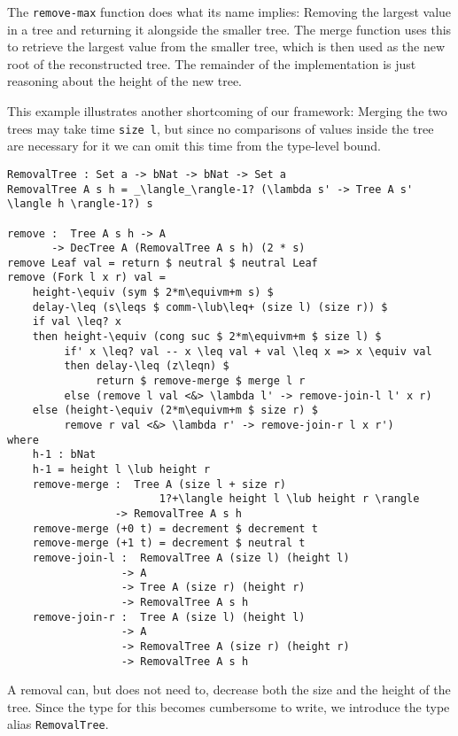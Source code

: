 The \texttt{remove-max} function does what its name implies: Removing the largest value in a tree and returning it alongside the smaller tree. The merge function uses this to retrieve the largest value from the smaller tree, which is then used as the new root of the reconstructed tree. The remainder of the implementation is just reasoning about the height of the new tree.

This example illustrates another shortcoming of our framework: Merging the two trees may take time \texttt{size l}, but since no comparisons of values inside the tree are necessary for it we can omit this time from the type-level bound.

\begin{lstlisting}[caption={Tree Removal},label={lst:tree:removal},emph={Tree,Fork,Leaf,RemovalTree,return,if,then,else,neutral,decrement,remove}]
RemovalTree : Set a -> bNat -> bNat -> Set a
RemovalTree A s h = _\langle_\rangle-1? (\lambda s' -> Tree A s' \langle h \rangle-1?) s

remove :  Tree A s h -> A
       -> DecTree A (RemovalTree A s h) (2 * s)
remove Leaf val = return $ neutral $ neutral Leaf
remove (Fork l x r) val =
    height-\equiv (sym $ 2*m\equivm+m s) $
    delay-\leq (s\leqs $ comm-\lub\leq+ (size l) (size r)) $
    if val \leq? x
    then height-\equiv (cong suc $ 2*m\equivm+m $ size l) $
         if' x \leq? val -- x \leq val + val \leq x => x \equiv val
         then delay-\leq (z\leqn) $
              return $ remove-merge $ merge l r
         else (remove l val <&> \lambda l' -> remove-join-l l' x r)
    else (height-\equiv (2*m\equivm+m $ size r) $
         remove r val <&> \lambda r' -> remove-join-r l x r')
where
    h-1 : bNat
    h-1 = height l \lub height r
    remove-merge :  Tree A (size l + size r)
                        1?+\langle height l \lub height r \rangle
                 -> RemovalTree A s h
    remove-merge (+0 t) = decrement $ decrement t
    remove-merge (+1 t) = decrement $ neutral t
    remove-join-l :  RemovalTree A (size l) (height l)
                  -> A
                  -> Tree A (size r) (height r)
                  -> RemovalTree A s h
    remove-join-r :  Tree A (size l) (height l)
                  -> A
                  -> RemovalTree A (size r) (height r)
                  -> RemovalTree A s h
\end{lstlisting}

A removal can, but does not need to, decrease both the size and the height of the tree. Since the type for this becomes cumbersome to write, we introduce the type alias \texttt{RemovalTree}.

